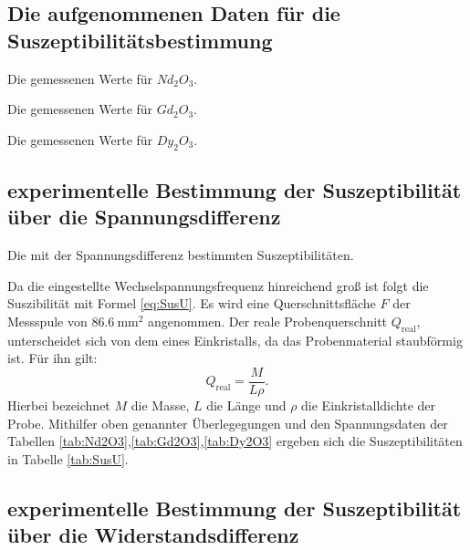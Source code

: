 \subsection{Die aufgenommenen Daten für die Suszeptibilitätsbestimmung}

\begin{table}
 \centering
 \caption{Die gemessenen Werte für $Nd_2O_3$.}
 
 \label{tab:Nd2O3}
\end{table}

\begin{table}
 \centering
 \caption{Die gemessenen Werte für $Gd_2O_3$.}
 
 \label{tab:Gd2O3}
\end{table}


\begin{table}
 \centering
 \caption{Die gemessenen Werte für $Dy_2O_3$.}
 
 \label{tab:Dy2O3}
\end{table}

\subsection{experimentelle Bestimmung der Suszeptibilität über die Spannungsdifferenz}

\begin{table}
 \centering
 \caption{Die mit der Spannungsdifferenz bestimmten Suszeptibilitäten.}
 
 \label{tab:SusU}
\end{table}

Da die eingestellte Wechselspannungsfrequenz hinreichend groß ist folgt die
Suszibilität mit Formel \ref{eq:SusU}. Es wird eine Querschnittsfläche $F$
der Messspule von $\SI{86.6}{\milli\square\meter}$ angenommen. Der reale Probenquerschnitt $Q_\text{real}$,
unterscheidet sich von dem eines Einkristalls, da das Probenmaterial staubförmig ist. Für ihn gilt:
\begin{equation}
  Q_\text{real} = \frac{M}{L \rho}\text{.}
\end{equation}
Hierbei bezeichnet $M$ die Masse, $L$ die Länge und $\rho$ die Einkristalldichte der Probe.
Mithilfer oben genannter Überlegegungen und den Spannungsdaten der Tabellen \ref{tab:Nd2O3},\ref{tab:Gd2O3},\ref{tab:Dy2O3}
ergeben sich die Suszeptibilitäten in Tabelle \ref{tab:SusU}.



\subsection{experimentelle Bestimmung der Suszeptibilität über die Widerstandsdifferenz}


